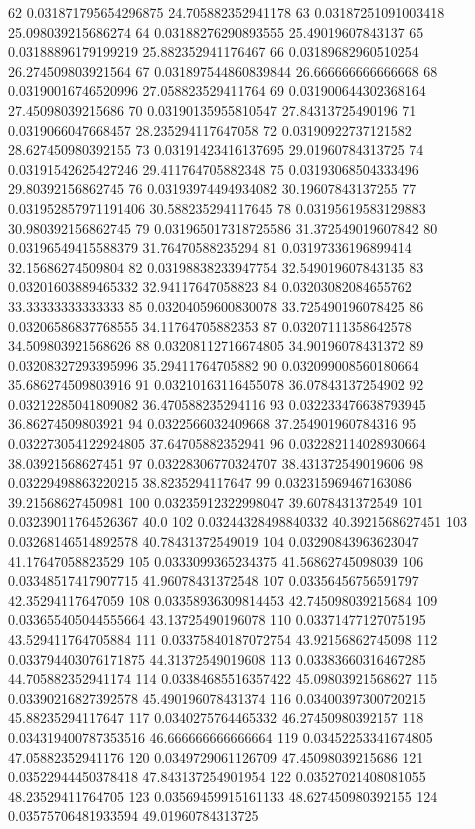 {62 0.031871795654296875 24.705882352941178
63 0.03187251091003418 25.098039215686274
64 0.03188276290893555 25.49019607843137
65 0.03188896179199219 25.882352941176467
66 0.03189682960510254 26.274509803921564
67 0.031897544860839844 26.666666666666668
68 0.03190016746520996 27.058823529411764
69 0.031900644302368164 27.45098039215686
70 0.03190135955810547 27.84313725490196
71 0.0319066047668457 28.235294117647058
72 0.03190922737121582 28.627450980392155
73 0.03191423416137695 29.01960784313725
74 0.03191542625427246 29.411764705882348
75 0.03193068504333496 29.80392156862745
76 0.03193974494934082 30.19607843137255
77 0.031952857971191406 30.588235294117645
78 0.03195619583129883 30.980392156862745
79 0.031965017318725586 31.372549019607842
80 0.03196549415588379 31.76470588235294
81 0.03197336196899414 32.15686274509804
82 0.03198838233947754 32.549019607843135
83 0.03201603889465332 32.94117647058823
84 0.03203082084655762 33.33333333333333
85 0.03204059600830078 33.725490196078425
86 0.03206586837768555 34.11764705882353
87 0.03207111358642578 34.509803921568626
88 0.03208112716674805 34.90196078431372
89 0.03208327293395996 35.29411764705882
90 0.032099008560180664 35.686274509803916
91 0.03210163116455078 36.07843137254902
92 0.03212285041809082 36.470588235294116
93 0.032233476638793945 36.86274509803921
94 0.0322566032409668 37.254901960784316
95 0.032273054122924805 37.64705882352941
96 0.032282114028930664 38.03921568627451
97 0.03228306770324707 38.431372549019606
98 0.03229498863220215 38.8235294117647
99 0.032315969467163086 39.21568627450981
100 0.03235912322998047 39.6078431372549
101 0.03239011764526367 40.0
102 0.03244328498840332 40.3921568627451
103 0.03268146514892578 40.78431372549019
104 0.03290843963623047 41.17647058823529
105 0.0333099365234375 41.56862745098039
106 0.03348517417907715 41.96078431372548
107 0.03356456756591797 42.35294117647059
108 0.03358936309814453 42.745098039215684
109 0.033655405044555664 43.13725490196078
110 0.03371477127075195 43.529411764705884
111 0.03375840187072754 43.92156862745098
112 0.033794403076171875 44.31372549019608
113 0.03383660316467285 44.705882352941174
114 0.03384685516357422 45.09803921568627
115 0.03390216827392578 45.490196078431374
116 0.03400397300720215 45.88235294117647
117 0.0340275764465332 46.27450980392157
118 0.034319400787353516 46.666666666666664
119 0.03452253341674805 47.05882352941176
120 0.0349729061126709 47.45098039215686
121 0.03522944450378418 47.843137254901954
122 0.03527021408081055 48.23529411764705
123 0.03569459915161133 48.627450980392155
124 0.03575706481933594 49.01960784313725
}
